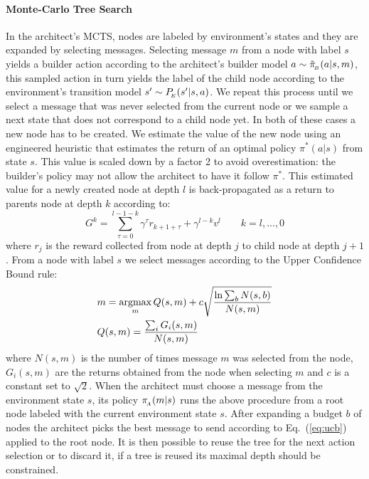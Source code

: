 \paragraph{Monte-Carlo Tree Search }
In the architect's MCTS, nodes are labeled by environment's states and they are expanded by selecting messages. Selecting message $m$ from a node with label $s$ yields a builder action according to the architect's builder model $a\sim \tilde{\pi}_{\!_B}(a|s,m)$, this sampled action in turn yields the label of the child node according to the environment's transition model $s'\sim P_{\!_E}(s'|s,a)$. We repeat this process until we select a message that was never selected from the current node  or we sample a next state that does not correspond to a child node yet. In both of these cases a new node has to be created. We estimate the value of the new node using an engineered heuristic that estimates the return of an optimal policy $\pi^*(a|s)$ from state $s$. This value is scaled down by a factor 2 to avoid overestimation: the builder's policy may not allow the architect to have it follow $\pi^*$. This estimated value for a newly created node at depth $l$ is back-propagated as a return to parents node at depth $k$ according to:
\begin{equation}
    G^k=\sum_{\tau=0}^{l-1-k}\gamma^\tau r_{k+1+\tau} + \gamma^{l-k}v^l \qquad k=l,...,0
\end{equation}
where $r_j$ is the reward collected from node at depth $j$ to child node at depth $j+1$.  
From a node with label $s$ we select messages according to the Upper Confidence Bound rule: 
\begin{equation}
\label{eq:ucb}
\begin{split}
&m = \operatorname*{argmax}_m Q(s,m) + c \sqrt{\frac{\ln \sum_b N(s,b)}{N(s,m)}}\\
&Q(s,m) = \frac{\sum_iG_i(s,m)}{N(s,m)}
\end{split}
\end{equation}
where $N(s,m)$ is the number of times message $m$ was selected from the node, $G_i(s,m)$ are the returns obtained from the node when selecting $m$ and $c$ is a constant set to $\sqrt{2}$.
When the architect must choose a message from the environment state $s$, its policy $\pi_{\!_A}(m|s)$ runs the above procedure from a root node labeled with the current environment state $s$. After expanding a budget $b$ of nodes the architect picks the best message to send according to Eq.~(\ref{eq:ucb}) applied to the root node. It is then possible to reuse the tree for the next action selection or to discard it, if a tree is reused its maximal depth should be constrained.

